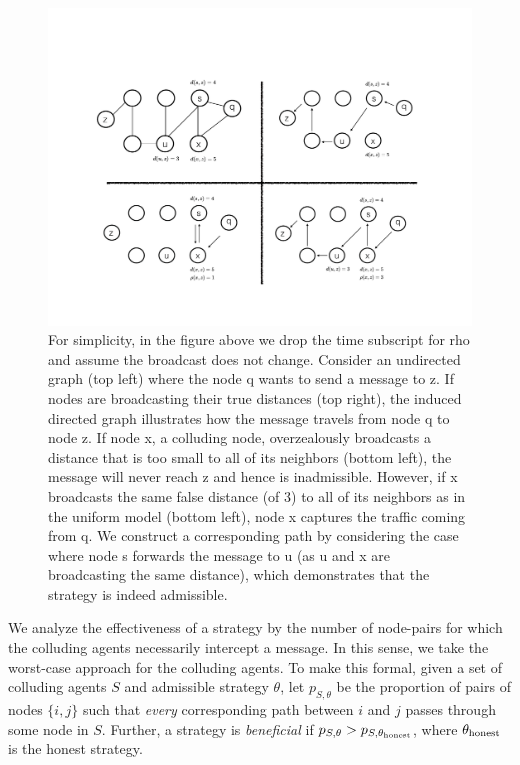 \documentclass[reprint]{revtex4-1}
\begin{document}
\begin{figure}
\centering
\includegraphics[width=\textwidth]{images/bgppanel2.pdf}
\caption{For simplicity, in the figure above we drop the time subscript for rho and assume the broadcast does not change.  Consider an undirected graph (top left) where the node q wants to send a message to z.  If nodes are broadcasting their true distances (top right), the induced directed graph illustrates how the message travels from node q to node z.  If node x, a colluding node, overzealously broadcasts a distance that is too small to all of its neighbors (bottom left), the message will never reach z and hence is inadmissible.  However, if x broadcasts the same false distance (of 3) to all of its neighbors as in the uniform model (bottom left), node x captures the traffic coming from q.  We construct a corresponding path by considering the case where node s forwards the message to u (as u and x are broadcasting the same distance), which demonstrates that the strategy is indeed admissible.}
\label{fig:admissibility}
\end{figure}

We analyze the effectiveness of a strategy by the number of node-pairs for which the colluding agents necessarily intercept a message. In this sense, we take the worst-case approach for the colluding agents. To make this formal, given a set of colluding agents $S$ and admissible strategy $\theta$, let $p_{S,\theta}$ be the proportion of pairs of nodes $\{i, j\}$ such that {\em every} corresponding path between $i$ and $j$ passes through some node in $S$. Further, a strategy is \emph{beneficial} if $p_{S,\theta} > p_{S, \theta_{\textup{honest}}}$, where $\theta_{\textup{honest}}$ is the honest strategy.
\end{document}
